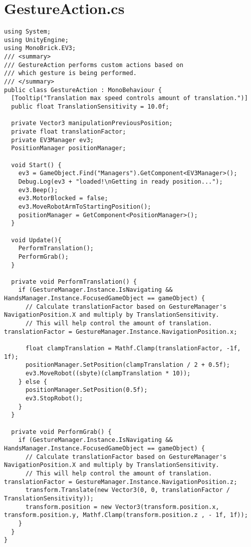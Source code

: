 \section{GestureAction.cs}
\begin{lstlisting}[caption=GestureAction.cs, label=code:GestureAction]
using System;
using UnityEngine;
using MonoBrick.EV3;
/// <summary>
/// GestureAction performs custom actions based on
/// which gesture is being performed.
/// </summary>
public class GestureAction : MonoBehaviour {
  [Tooltip("Translation max speed controls amount of translation.")]        
  public float TranslationSensitivity = 10.0f;  
    
  private Vector3 manipulationPreviousPosition;        
  private float translationFactor;     
  private EV3Manager ev3;     
  PositionManager positionManager;     
 
  void Start() {         
	ev3 = GameObject.Find("Managers").GetComponent<EV3Manager>();        
	Debug.Log(ev3 + "loaded!\nGetting in ready position...");
	ev3.Beep();         
	ev3.MotorBlocked = false;         
	ev3.MoveRobotArmToStartingPosition();         
	positionManager = GetComponent<PositionManager>();     
  }     
  
  void Update(){      
    PerformTranslation();         
    PerformGrab();     
  }     
  
  private void PerformTranslation() {         
    if (GestureManager.Instance.IsNavigating && HandsManager.Instance.FocusedGameObject == gameObject) {             
      // Calculate translationFactor based on GestureManager's NavigationPosition.X and multiply by TranslationSensitivity.             
      // This will help control the amount of translation.             translationFactor = GestureManager.Instance.NavigationPosition.x;          
    
      float clampTranslation = Mathf.Clamp(translationFactor, -1f, 1f);      
      positionManager.SetPosition(clampTranslation / 2 + 0.5f);
      ev3.MoveRobot((sbyte)(clampTranslation * 10));         
    } else {             
	  positionManager.SetPosition(0.5f);             
	  ev3.StopRobot();         
	}     
  }     
  
  private void PerformGrab() {         
	if (GestureManager.Instance.IsNavigating && HandsManager.Instance.FocusedGameObject == gameObject) {             
	  // Calculate translationFactor based on GestureManager's NavigationPosition.X and multiply by TranslationSensitivity.             
	  // This will help control the amount of translation.             translationFactor = GestureManager.Instance.NavigationPosition.z;         
	  transform.Translate(new Vector3(0, 0, translationFactor / TranslationSensitivity));             
	  transform.position = new Vector3(transform.position.x, transform.position.y, Mathf.Clamp(transform.position.z , - 1f, 1f));
	}
  }
}
\end{lstlisting}
